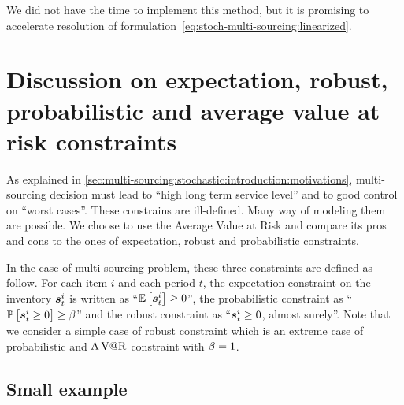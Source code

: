 We did not have the time to implement this method, but it is promising to accelerate resolution of formulation~\eqref{eq:stoch-multi-sourcing:linearized}.



\section{Discussion on expectation, robust, probabilistic and average value at risk constraints}
\label{sec:multi-sourcing:stochastic:discussion}


As explained in \cref{sec:multi-sourcing:stochastic:introduction:motivations}, multi-sourcing decision must lead to ``high long term service level'' and to good control on ``worst cases''.
These constrains are ill-defined.
Many way of modeling them are possible.
We choose to use the Average Value at Risk and compare its pros and cons to the ones of expectation, robust and probabilistic constraints.


In the case of multi-sourcing problem, these three constraints are defined as follow.
For each item $i$ and each period $t$, the expectation constraint on the inventory $\va\inventory_t^i$ is written as ``$\espe\sqbracket{\va\inventory_t^i}\ge0$'', the probabilistic constraint as ``$\prob\sqbracket{\va\inventory_t^i\ge0}\ge\servicelvl$'' and the robust constraint as ``$\va\inventory_t^i\ge0$, almost surely''.
Note that we consider a simple case of robust constraint which is an extreme case of probabilistic and $\operatorname{A\operatorname{V@R}}$ constraint with $\beta=1$.




\subsection{Small example}
\label{sec:multi-sourcing:stochastic:discussion:small-example}


